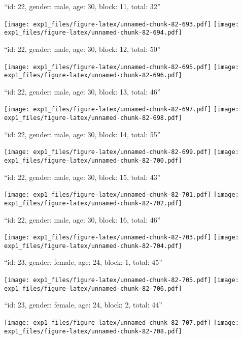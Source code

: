 \documentclass[11pt,,]{article}
\begin{document}
\newpage
[1] 

``id: 22, gender: male, age: 30, block: 11, total: 32''

\texttt{[image: exp1\_files/figure-latex/unnamed-chunk-82-693.pdf]}
\texttt{[image: exp1\_files/figure-latex/unnamed-chunk-82-694.pdf]}

\newpage
[1] 

``id: 22, gender: male, age: 30, block: 12, total: 50''

\texttt{[image: exp1\_files/figure-latex/unnamed-chunk-82-695.pdf]}
\texttt{[image: exp1\_files/figure-latex/unnamed-chunk-82-696.pdf]}

\newpage
[1] 

``id: 22, gender: male, age: 30, block: 13, total: 46''

\texttt{[image: exp1\_files/figure-latex/unnamed-chunk-82-697.pdf]}
\texttt{[image: exp1\_files/figure-latex/unnamed-chunk-82-698.pdf]}

\newpage
[1] 

``id: 22, gender: male, age: 30, block: 14, total: 55''

\texttt{[image: exp1\_files/figure-latex/unnamed-chunk-82-699.pdf]}
\texttt{[image: exp1\_files/figure-latex/unnamed-chunk-82-700.pdf]}

\newpage
[1] 

``id: 22, gender: male, age: 30, block: 15, total: 43''

\texttt{[image: exp1\_files/figure-latex/unnamed-chunk-82-701.pdf]}
\texttt{[image: exp1\_files/figure-latex/unnamed-chunk-82-702.pdf]}

\newpage
[1] 

``id: 22, gender: male, age: 30, block: 16, total: 46''

\texttt{[image: exp1\_files/figure-latex/unnamed-chunk-82-703.pdf]}
\texttt{[image: exp1\_files/figure-latex/unnamed-chunk-82-704.pdf]}

\newpage
[1] 

``id: 23, gender: female, age: 24, block: 1, total: 45''

\texttt{[image: exp1\_files/figure-latex/unnamed-chunk-82-705.pdf]}
\texttt{[image: exp1\_files/figure-latex/unnamed-chunk-82-706.pdf]}

\newpage
[1] 

``id: 23, gender: female, age: 24, block: 2, total: 44''

\texttt{[image: exp1\_files/figure-latex/unnamed-chunk-82-707.pdf]}
\texttt{[image: exp1\_files/figure-latex/unnamed-chunk-82-708.pdf]}
\end{document}
